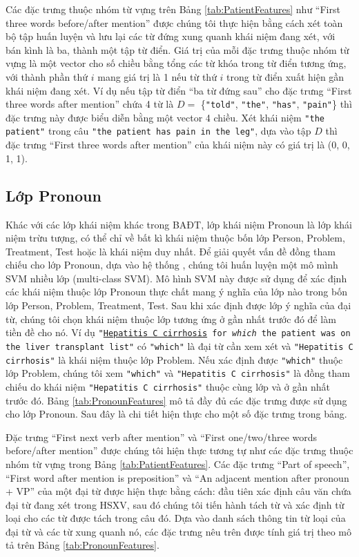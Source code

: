 Các đặc trưng thuộc nhóm từ vựng trên Bảng \ref{tab:PatientFeatures} như ``First three words before/after mention'' được chúng tôi thực hiện bằng cách xét toàn bộ tập huấn luyện và lưu lại các từ đứng xung quanh khái niệm đang xét, với bán kình là ba, thành một tập từ điển. Giá trị của mỗi đặc trưng thuộc nhóm từ vựng là một vector cho số chiều bằng tổng các từ khóa trong từ điển tương ứng, với thành phần thứ $i$ mang giá trị là 1 nếu từ thứ $i$ trong từ điển xuất hiện gần khái niệm đang xét. Ví dụ nếu tập từ điển ``ba từ đứng sau'' cho đặc trưng ``First three words after mention'' chứa 4 từ là $D=$ \{\texttt{"told"}, \texttt{"the"}, \texttt{"has"}, \texttt{"pain"}\} thì đặc trưng này được biểu diễn bằng một vector 4 chiều. Xét khái niệm \texttt{"the patient"} trong câu \texttt{"the patient has pain in the leg"}, dựa vào tập $D$ thì đặc trưng ``First three words after mention'' của khái niệm này có giá trị là (0, 0, 1, 1).

\subsection*{Lớp Pronoun}
Khác với các lớp khái niệm khác trong BAĐT, lớp khái niệm Pronoun là lớp khái niệm trừu tượng, có thể chỉ về bất kì khái niệm thuộc bốn lớp Person, Problem, Treatment, Test hoặc là khái niệm duy nhất. Để giải quyết vấn đề đồng tham chiếu cho lớp Pronoun, dựa vào hệ thống \cite{YanXu2012}, chúng tôi huấn luyện một mô mình SVM nhiều lớp (multi-class SVM). Mô hình SVM này được sử dụng để xác định các khái niệm thuộc lớp Pronoun thực chất mang ý nghĩa của lớp nào trong bốn lớp Person, Problem, Treatment, Test. Sau khi xác định được lớp ý nghĩa của đại từ, chúng tôi chọn khái niệm thuộc lớp tương ứng ở gần nhất trước đó để làm tiền đề cho nó. Ví dụ \texttt{"\underline{Hepatitis C cirrhosis} for \textsl{which} the patient was on the liver transplant list"} có \texttt{"which"} là đại từ cần xem xét và \texttt{"Hepatitis C cirrhosis"} là khái niệm thuộc lớp Problem. Nếu xác định được \texttt{"which"} thuộc lớp Problem, chúng tôi xem \texttt{"which"} và \texttt{"Hepatitis C cirrhosis"} là đồng tham chiếu do khái niệm \texttt{"Hepatitis C cirrhosis"} thuộc cùng lớp và ở gần nhất trước đó. Bảng \ref{tab:PronounFeatures} mô tả đầy đủ các đặc trưng được sử dụng cho lớp Pronoun. Sau đây là chi tiết hiện thực cho một số đặc trưng trong bảng.

Đặc trưng ``First next verb after mention'' và ``First one/two/three words before/after mention'' được chúng tôi hiện thực tương tự như các đặc trưng thuộc nhóm từ vựng trong Bảng \ref{tab:PatientFeatures}. Các đặc trưng ``Part of speech'', ``First word after mention is preposition'' và ``An adjacent mention after pronoun + VP'' của một đại từ được hiện thực bằng cách: đầu tiên xác định câu văn chứa đại từ đang xét trong HSXV, sau đó chúng tôi tiến hành tách từ và xác định từ loại cho các từ được tách trong câu đó. Dựa vào danh sách thông tin từ loại của đại từ và các từ xung quanh nó, các đặc trưng nêu trên được tính giá trị theo mô tả trên Bảng \ref{tab:PronounFeatures}.

